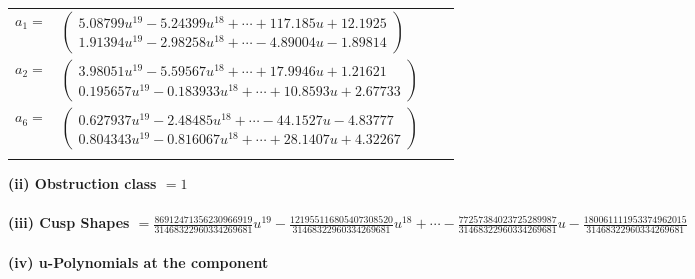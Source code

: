 \documentclass[1p]{elsarticle_modified}
\theoremstyle{definition}
\begin{document}
\begin{tabular}{m{7pt} m{180pt} m{7pt} m{180pt} }
\flushright $a_{1}=$&$\begin{pmatrix}5.08799 u^{19}-5.24399 u^{18}+\cdots+117.185 u+12.1925\\1.91394 u^{19}-2.98258 u^{18}+\cdots-4.89004 u-1.89814\end{pmatrix}$ \\
\flushright $a_{2}=$&$\begin{pmatrix}3.98051 u^{19}-5.59567 u^{18}+\cdots+17.9946 u+1.21621\\0.195657 u^{19}-0.183933 u^{18}+\cdots+10.8593 u+2.67733\end{pmatrix}$ \\
\flushright $a_{6}=$&$\begin{pmatrix}0.627937 u^{19}-2.48485 u^{18}+\cdots-44.1527 u-4.83777\\0.804343 u^{19}-0.816067 u^{18}+\cdots+28.1407 u+4.32267\end{pmatrix}$\\&\end{tabular}
\flushleft \textbf{(ii) Obstruction class $= 1$}\\~\\
\flushleft \textbf{(iii) Cusp Shapes $= \frac{86912471356230966919}{31468322960334269681} u^{19}-\frac{121955116805407308520}{31468322960334269681} u^{18}+\cdots-\frac{77257384023725289987}{31468322960334269681} u-\frac{180061111953374962015}{31468322960334269681}$}\\~\\
\newpage\renewcommand{\arraystretch}{1}
\flushleft \textbf{(iv) u-Polynomials at the component}\newline \\
\end{document}
